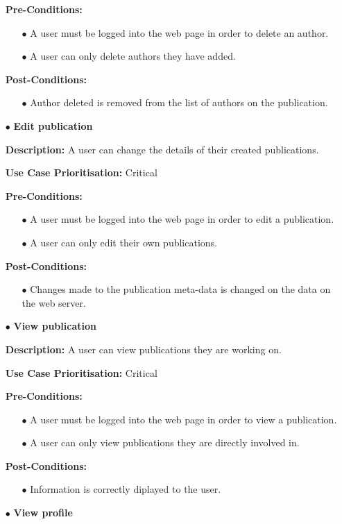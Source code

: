 \documentclass[a4paper,12pt]{article}
\begin{document}
\begin{itemize}
	\textbf{Pre-Conditions:}
	\begin{itemize}
		\item[$\bullet$]A user must be logged into the web page in order to delete an author.
		\item[$\bullet$]A user can only delete authors they have added.
		\\
	\end{itemize}
	\textbf{Post-Conditions: }
	\begin{itemize}
		\item[$\bullet$]Author deleted is removed from the list of authors on the publication.
		\\
	\end{itemize}
	\item[$\bullet$]\textbf{Edit publication}\newline

	\textbf{Description:} A user can change the details of their created publications.\newline
	
	\textbf{Use Case Prioritisation:} Critical\newline

	\textbf{Pre-Conditions:}
	\begin{itemize}
		\item[$\bullet$]A user must be logged into the web page in order to edit a publication.
		\item[$\bullet$]A user can only edit their own publications.
		\\
	\end{itemize}
	\textbf{Post-Conditions: }
	\begin{itemize}
		\item[$\bullet$]Changes made to the publication meta-data is changed on the data on the web server.
		\\
	\end{itemize}

	\newpage
	\item[$\bullet$]\textbf{View publication}\newline

	\textbf{Description:} A user can view publications they are working on.\newline
	
	\textbf{Use Case Prioritisation:} Critical\newline	

	\textbf{Pre-Conditions:}
	\begin{itemize}
		\item[$\bullet$]A user must be logged into the web page in order to view a publication.
		\item[$\bullet$]A user can only view publications they are directly involved in.
		\\
	\end{itemize}
	\textbf{Post-Conditions: }
	\begin{itemize}
		\item[$\bullet$]Information is correctly diplayed to the user.
		\\
	\end{itemize}
	\item[$\bullet$]\textbf{View profile}\newline


\end{itemize}
\end{document}

